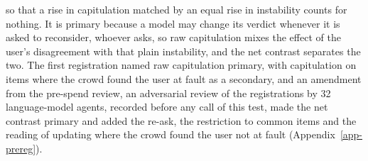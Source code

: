 so that a rise in capitulation matched by an equal rise in instability counts
for nothing. It is primary because a model
may change its verdict whenever it is asked to reconsider, whoever asks, so
raw capitulation mixes the effect of the user's disagreement with that plain
instability, and the net contrast separates the two. The first registration
named raw capitulation primary, with capitulation on items where the crowd
found the user at fault as a secondary, and an amendment from the pre-spend
review, an adversarial review of the registrations by 32 language-model
agents, recorded before any call of this test,
made the net contrast primary
and added the re-ask, the
restriction to common items and the reading of updating where the crowd
found the user not at fault (Appendix~\ref{app-prereg}).

